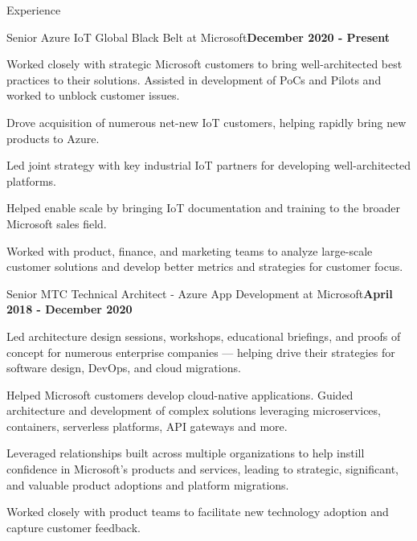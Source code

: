 \documentclass{resume} %
\begin{document}
\begin{rSection}{Experience}


\begin{rSubsection}{Senior Azure IoT Global Black Belt at Microsoft}{\bf December 2020 - Present}{}{}

\item Worked closely with strategic Microsoft customers to bring well-architected best practices to their solutions. Assisted in development of PoCs and Pilots and worked to unblock customer issues.  
\item Drove acquisition of numerous net-new IoT customers, helping  rapidly bring new products to Azure.
\item Led joint strategy with key industrial IoT partners for developing well-architected platforms.
\item Helped enable scale by bringing IoT documentation and training to the broader Microsoft sales field.
\item Worked with product, finance, and marketing teams to analyze large-scale customer solutions and develop better metrics and strategies for customer focus.

\end{rSubsection}


\begin{rSubsection}{Senior MTC Technical Architect - Azure App Development at Microsoft}{\bf April 2018 - December 2020}{}{}

\item Led architecture design sessions, workshops, educational briefings, and proofs of concept for numerous enterprise companies --- helping drive their strategies for software design, DevOps, and cloud migrations.
\item Helped Microsoft customers develop cloud-native applications.  Guided architecture and development of complex solutions leveraging microservices, containers, serverless platforms, API gateways and more.
\item Leveraged relationships built across multiple organizations to help instill confidence in Microsoft's products and services, leading to strategic, significant, and valuable product adoptions and platform migrations.
\item Worked closely with product teams to facilitate new technology adoption and capture customer feedback.
    

\end{rSubsection}
\end{rSection}
\end{document}
